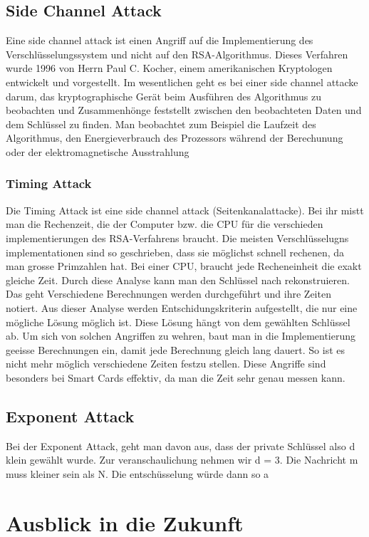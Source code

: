 %
\subsection{Side Channel Attack}
Eine side channel attack ist einen Angriff auf die Implementierung des Verschlüsselungssystem und nicht auf den RSA-Algorithmus. Dieses Verfahren wurde 1996 von Herrn Paul C. Kocher, einem amerikanischen Kryptologen entwickelt und vorgestellt.
Im wesentlichen geht es bei einer side channel attacke darum, das kryptographische Gerät beim Ausführen des Algorithmus zu beobachten und Zusammenhönge feststellt zwischen den beobachteten Daten und dem Schlüssel zu finden.
Man beobachtet zum Beispiel die Laufzeit des Algorithmus, den Energieverbrauch des Prozessors während der Berechunung oder der elektromagnetische Ausstrahlung
%
\subsubsection{Timing Attack}
Die Timing Attack ist eine side channel attack (Seitenkanalattacke). 
Bei ihr mistt man die Rechenzeit, die der Computer bzw. die CPU für die verschieden implementierungen des RSA-Verfahrens braucht. Die meisten Verschlüsselugns implementationen sind so geschrieben, dass sie möglichst schnell rechenen, da man grosse Primzahlen hat. Bei einer CPU, braucht jede Recheneinheit die exakt gleiche Zeit. Durch diese Analyse kann man den Schlüssel nach rekonstruieren. Das geht 
%
Verschiedene Berechnungen werden durchgeführt und ihre Zeiten notiert. Aus dieser Analyse werden Entschidungskriterin aufgestellt, die nur eine mögliche Lösung möglich ist. Diese Lösung hängt von dem gewählten Schlüssel ab.
%
Um sich von solchen Angriffen zu wehren, baut man in die Implementierung geeisse Berechnungen ein, damit jede Berechnung gleich lang dauert. So ist es nicht mehr möglich verschiedene Zeiten festzu stellen.
%
Diese Angriffe sind besonders bei Smart Cards effektiv, da man die Zeit sehr genau messen kann.
%
\subsection{Exponent Attack}
Bei der Exponent Attack, geht man davon aus, dass der private Schlüssel also d klein gewählt wurde. Zur veranschaulichung nehmen wir d = 3.
Die Nachricht m muss kleiner sein als N. Die entschüsselung würde dann so a
\section{Ausblick in die Zukunft}

